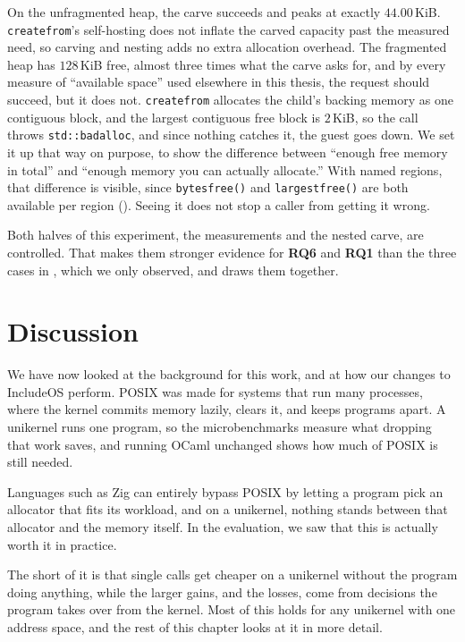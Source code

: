 \documentclass[12pt]{report}
\newcommand{\fullref}[1]{\Cref{#1}}
\renewcommand{\_}{\origunderscore\allowbreak}
\begin{document}
On the unfragmented heap, the carve succeeds and peaks at exactly $44.00$\,KiB. \texttt{create\_from}'s self-hosting does not inflate the carved capacity past the measured need, so carving and nesting adds no extra allocation overhead. The fragmented heap has $128$\,KiB free, almost three times what the carve asks for, and by every measure of ``available space'' used elsewhere in this thesis, the request should succeed, but it does not. \texttt{create\_from} allocates the child's backing memory as one contiguous block, and the largest contiguous free block is $2$\,KiB, so the call throws \texttt{std::bad\_alloc}, and since nothing catches it, the guest goes down. We set it up that way on purpose, to show the difference between ``enough free memory in total'' and ``enough memory you can actually allocate.'' With named regions, that difference is visible, since \texttt{bytes\_free()} and \texttt{largest\_free()} are both available per region (\fullref{sec:memory-model}). Seeing it does not stop a caller from getting it wrong.

Both halves of this experiment, the measurements and the nested carve, are controlled. That makes them stronger evidence for \textbf{RQ6} and \textbf{RQ1} than the three cases in \fullref{sec:memory-model}, which we only observed, and \fullref{sec:rq-answers} draws them together.


\chapter{Discussion}
\label{sec:discussion}

We have now looked at the background for this work, and at how our changes to IncludeOS perform. POSIX was made for systems that run many processes, where the kernel commits memory lazily, clears it, and keeps programs apart. A unikernel runs one program, so the microbenchmarks measure what dropping that work saves, and running OCaml unchanged shows how much of POSIX is still needed.

Languages such as Zig can entirely bypass POSIX by letting a program pick an allocator that fits its workload, and on a unikernel, nothing stands between that allocator and the memory itself. In the evaluation, we saw that this is actually worth it in practice.

The short of it is that single calls get cheaper on a unikernel without the program doing anything, while the larger gains, and the losses, come from decisions the program takes over from the kernel. Most of this holds for any unikernel with one address space, and the rest of this chapter looks at it in more detail.
\end{document}
